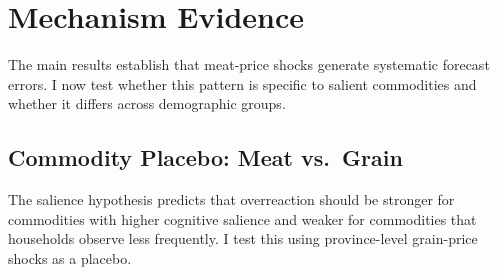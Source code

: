 
\section{Mechanism Evidence}\label{sec:mechanism}

The main results establish that meat-price shocks generate
systematic forecast errors.
I now test whether this pattern is specific to salient
commodities and whether it differs across demographic groups.

\subsection{Commodity Placebo: Meat vs.\ Grain}%
\label{sec:placebo}



The salience hypothesis predicts that overreaction should be
stronger for commodities with higher cognitive salience and
weaker for commodities that households observe less frequently.
I test this using province-level grain-price shocks as a
placebo.

